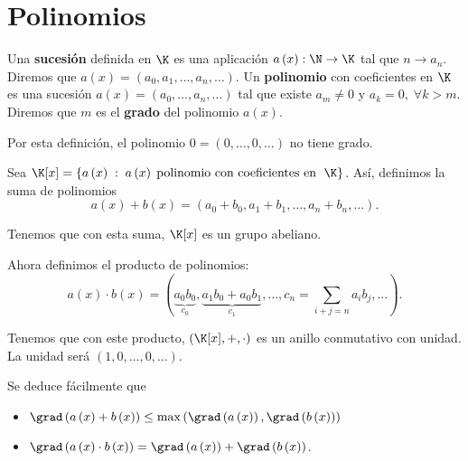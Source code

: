 \section{Polinomios}

\begin{fdefinition}[]
\normalfont Una \textbf{sucesión} definida en $\displaystyle \K $ es una aplicación $\displaystyle a\left(x\right) : \N \to \K $ tal que $\displaystyle n \to a_{n} $. Diremos que $\displaystyle a\left(x\right) = \left(a_{0}, a_{1}, \ldots, a_{n}, \ldots\right) $. Un \textbf{polinomio} con coeficientes en $\displaystyle \K $ es una sucesión $\displaystyle a\left(x\right) = \left(a_{0}, \ldots, a_{n}, \ldots\right) $ tal que existe $\displaystyle a_{m} \neq 0 $ y $\displaystyle a_{k} = 0, \; \forall k > m $. Diremos que $\displaystyle m $ es el \textbf{grado} del polinomio $\displaystyle a\left(x\right) $.
\end{fdefinition}

\begin{observation}
\normalfont Por esta definición, el polinomio $\displaystyle 0 = \left(0, \ldots, 0, \ldots\right) $ no tiene grado.
\end{observation}
Sea $\displaystyle \K[x] = \left\{ a\left(x\right) \; : \; a\left(x\right) \; \text{polinomio con coeficientes en } \; \K\right\}  $. Así, definimos la suma de polinomios
\[a\left(x\right) + b\left(x\right) = \left(a_{0}+b_{0}, a_{1}+b_{1}, \ldots, a_{n}+b_{n}, \ldots\right) .\]
\begin{observation}
	\normalfont Tenemos que con esta suma, $\displaystyle \K[x] $ es un grupo abeliano. 
\end{observation}
Ahora definimos el producto de polinomios:
\[a\left(x\right) \cdot b\left(x\right) = \left(\underbrace{a_{0}b_{0}}_{c_{0}}, \underbrace{a_{1}b_{0} + a_{0}b_{1}}_{c_{1}}, \ldots, c_{n} = \sum_{i + j = n}a_{i}b_{j}, \ldots\right) .\]
\begin{observation}
	\normalfont Tenemos que con este producto, $\displaystyle \left( \K[x], + , \cdot\right) $ es un anillo conmutativo con unidad. La unidad será $\displaystyle \left(1, 0, \ldots, 0, \ldots\right) $.  \end{observation}
\begin{observation}
\normalfont Se deduce fácilmente que
\begin{itemize}
\item  $\displaystyle \grad\left(a\left(x\right) + b\left(x\right)\right) \leq \max\left(\grad\left(a\left(x\right)\right), \grad\left(b\left(x\right)\right)\right) $ 
\item $\displaystyle \grad\left(a\left(x\right) \cdot b\left(x\right)\right) = \grad\left(a\left(x\right)\right) + \grad\left(b\left(x\right)\right) $.
\end{itemize}
\end{observation}

